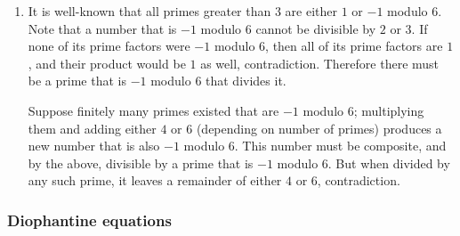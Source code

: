 \documentclass[10pt,paper=letter]{scrartcl}
\begin{document}
\begin{enumerate}
\item It is well-known that all primes greater than $3$ are either $1$ or $-1$ modulo $6$. Note that a number that is $-1$ modulo $6$ cannot be divisible by $2$ or $3$. If none of its prime factors were $-1$ modulo $6$, then all of its prime factors are $1$, and their product would be $1$ as well, contradiction. Therefore there must be a prime that is $-1$ modulo $6$ that divides it.

Suppose finitely many primes existed that are $-1$ modulo $6$; multiplying them and adding either $4$ or $6$ (depending on number of primes) produces a new number that is also $-1$ modulo $6$. This number must be composite, and by the above, divisible by a prime that is $-1$ modulo $6$. But when divided by any such prime, it leaves a remainder of either $4$ or $6$, contradiction.

\end{enumerate}

\subsubsection*{Diophantine equations}
\end{document}
